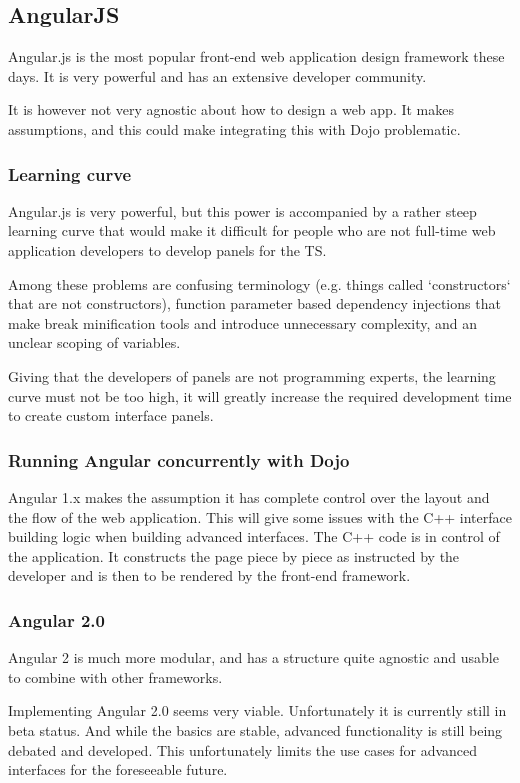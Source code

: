 \subsection{AngularJS}
Angular.js is the most popular front-end web application design framework these
days. It is very powerful and has an extensive developer community.

It is however not very agnostic about how to design a web app. It makes
assumptions, and this could make integrating this with Dojo problematic.


\subsubsection{Learning curve}
Angular.js is very powerful, but this power is accompanied by a rather steep
learning curve\cite{angular_learningcurve} that would make it difficult for people who are not full-time
web application developers to develop panels for the TS.

Among these problems are confusing terminology (e.g. things called `constructors`
that are not constructors), function parameter based dependency injections that
make break minification tools and introduce unnecessary complexity, and an
unclear scoping of variables.

Giving that the developers of panels are not programming experts, the learning
curve must not be too high, it will greatly increase the required development
time to create custom interface panels.

\subsubsection{Running Angular concurrently with Dojo}
Angular 1.x makes the assumption it has complete control over the layout and the
flow of the web application. This will give some issues with the  C++ interface
building logic when building advanced interfaces.
The C++ code is in control of the application. It constructs the page piece by
piece as instructed by the developer and is then to be rendered by the front-end
framework.

\subsubsection{Angular 2.0}
Angular 2 is much more modular, and has a structure quite agnostic and usable to
combine with other frameworks.

Implementing Angular 2.0 seems very viable. Unfortunately it is currently still
in beta status. And while the basics are stable, advanced functionality is still
being debated and developed. This unfortunately limits the use cases for
advanced interfaces for the foreseeable future.

